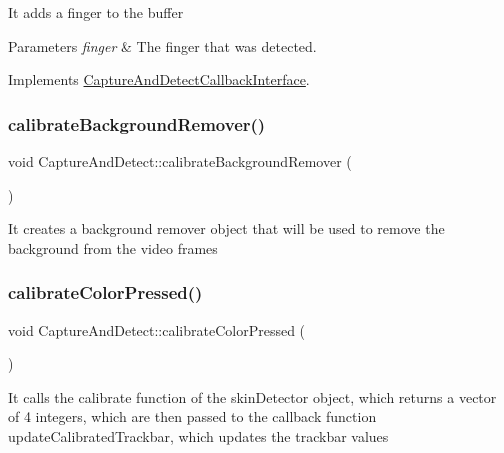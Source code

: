 It adds a finger to the buffer


\begin{DoxyParams}{Parameters}
{\em finger} & The finger that was detected. \\
\hline
\end{DoxyParams}


Implements \hyperlink{classCaptureAndDetectCallbackInterface_a259dc71fd5d02424b91906d708e7de1f}{Capture\+And\+Detect\+Callback\+Interface}.

\mbox{\label{classCaptureAndDetect_a53065abfb6eed6c074ad4d3370b3f232}} 
\subsubsection{\texorpdfstring{calibrate\+Background\+Remover()}{calibrateBackgroundRemover()}}
{\footnotesize\ttfamily void Capture\+And\+Detect\+::calibrate\+Background\+Remover (\begin{DoxyParamCaption}{ }\end{DoxyParamCaption})}

It creates a background remover object that will be used to remove the background from the video frames \mbox{\label{classCaptureAndDetect_ac60f9b1d192c043fa9b40c38fc5599e6}} 
\subsubsection{\texorpdfstring{calibrate\+Color\+Pressed()}{calibrateColorPressed()}}
{\footnotesize\ttfamily void Capture\+And\+Detect\+::calibrate\+Color\+Pressed (\begin{DoxyParamCaption}{ }\end{DoxyParamCaption})}

It calls the calibrate function of the skin\+Detector object, which returns a vector of 4 integers, which are then passed to the callback function update\+Calibrated\+Trackbar, which updates the trackbar values \mbox{\label{classCaptureAndDetect_aafb4f601f860dd38f514f6dd29a1d016}} 
